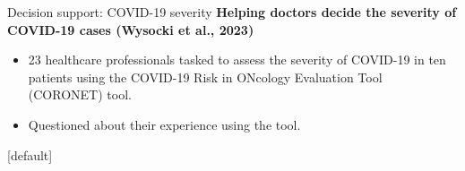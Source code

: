 \documentclass[8pt]{beamer}
\begin{document}
	\begin{frame}[t]{Decision support: COVID-19 severity} %
		\textbf{Helping doctors decide the severity of COVID-19 cases (Wysocki et al., 2023)}\\
		\begin{itemize}
			\item 23 healthcare professionals tasked to assess the severity of COVID-19 in ten patients using the COVID-19 Risk in ONcology Evaluation Tool (CORONET) tool.
			\item Questioned about their experience using the tool.
		\end{itemize}
		\vspace{0.5cm}
		\centering
	\end{frame}

	[default]
\end{document}
